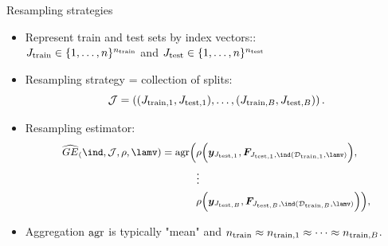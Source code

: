 
\begin{vbframe}{Resampling strategies}
\footnotesize
\begin{itemize}
  \item Represent train and test sets by index
  vectors::\\ 
  $\Jtrain \in \nset^{\ntrain}$ and $\Jtest
  \in \nset^{\ntest}$
  \item Resampling strategy = collection of splits:
  $$\JJ = \JJset.$$
  \item Resampling estimator:  
\begin{equation*}
\small
\begin{split}
\GEhresa = \agr\Big(
 &\rho\Big(\yv_{\Jtesti[1]}, \FJtestftraini[1]\Big), \\ &\large{\vdots} \\
& \rho\Big(\yv_{\Jtesti[B]}, \FJtestftraini[B]\Big)
    \Big),
\end{split}
\end{equation*}
\item Aggregation $\agr$ is typically "mean" and $\ntrain \approx \ntraini[1] \approx \dots \approx \ntraini[B]$.
\end{itemize}

\end{vbframe}


